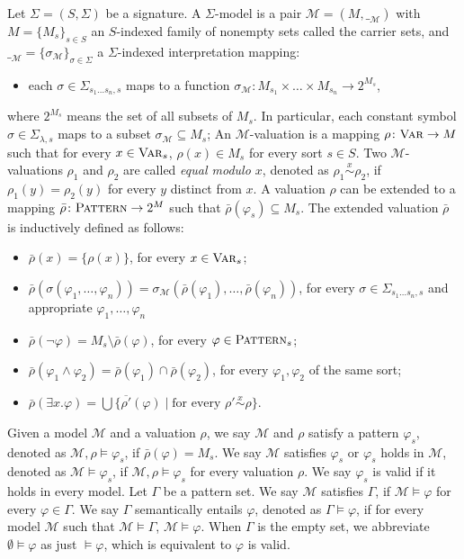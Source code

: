 \documentclass[acmsmall]{acmart}
\theoremstyle{acmdefinition}
\newcommand{\Var}{\textnormal{\textsc{Var}}}
\newcommand{\sig}{\mathbb{\Sigma}}
\newcommand{\Pattern}{\textnormal{\textsc{Pattern}}}
\newcommand{\MM}{\mathcal{M}}
\newcommand{\interp}[1]{\__{#1}}
\newcommand{\interpM}{\interp{\MM}}
\newcommand{\sigmaM}{{\sigma_{\MM}}}
\newcommand{\widebar}[1]{\overline{#1}}
\newcommand{\rhop}{\rho'}
\newcommand{\barrho}{\bar{\rho}}
\newcommand{\barrhop}{\widebar{\rhop}}
\newcommand{\simon}[1]{\overset{#1}{\sim}}
\newcommand{\simx}{\simon{x}}
\newcommand{\ddd}{,\dots,}
\newcommand{\SigmaSub}[1]{\Sigma_{#1}}
\newcommand{\pset}[1]{2^{#1}}
\begin{document}
\begin{definition}
\label{def_models}
Let $\sig = (S, \Sigma)$ be a signature.
A $\sig$-model is a pair
$\MM = (M, \interpM)$ with
$M = \{M_s\}_{s \in S}$ an $S$-indexed family of nonempty sets called
the carrier sets,
and $\interpM = \{ \sigmaM \}_{\sigma \in \Sigma}$
a $\Sigma$-indexed interpretation mapping:
\begin{itemize}
\item each $\sigma \in \SigmaSub{s_1 \dots s_n , s}$
      maps to a function
      $\sigmaM \colon M_{s_1} \times \dots \times M_{s_n} \to \pset{M_s}$,
\end{itemize}
where $2^{M_s}$ means the set of all subsets of $M_s$.
In particular, each constant symbol
$\sigma \in \SigmaSub{\lambda,s}$ 
maps to a subset $\sigmaM \subseteq M_s$;
An $\MM$-valuation is a mapping
$\rho \colon \Var \to M$
such that for every $x \in \Var_s$, $\rho(x) \in M_s$ for every sort $s \in S$.
Two $\MM$-valuations $\rho_1$ and $\rho_2$ are called 
\emph{equal modulo $x$},
denoted as $\rho_1 \simx \rho_2$,
if $\rho_1(y) = \rho_2(y)$ for every $y$ distinct from $x$.
A valuation $\rho$ can be extended to a mapping
$\barrho \colon \Pattern \to \pset{M}$
such that $\barrho(\varphi_s) \subseteq M_s$.
The extended valuation $\barrho$ is inductively defined as follows:
\begin{itemize}
\item $\barrho(x) = \{ \rho(x) \}$, for every $x \in \Var_s$;
\item $\barrho(\sigma(\varphi_1 \ddd \varphi_n))
       = \sigmaM( \barrho(\varphi_1) \ddd \barrho(\varphi_n) )$,
      for every $\sigma \in \SigmaSub{s_1 \dots s_n , s}$
      and appropriate $\varphi_1 \ddd \varphi_n$
\item $\barrho(\neg \varphi) = M_s \setminus \barrho(\varphi)$,
      for every $\varphi \in \Pattern_s$;
\item $\barrho(\varphi_1 \wedge \varphi_2)
       = \barrho(\varphi_1) \cap \barrho(\varphi_2)$,
      for every $\varphi_1,\varphi_2$ of the same sort;
\item $\barrho(\exists x . \varphi)
       = \bigcup \{ \barrhop(\varphi) 
                    \mid \text{for every $\rhop \simx \rho$} \}$.
\end{itemize}
Given a model $\MM$ and a valuation $\rho$,
we say $\MM$ and $\rho$ satisfy a pattern $\varphi_s$,
denoted as $\MM,\rho \vDash \varphi_s$,
if $\barrho(\varphi) = M_s$.
We say $\MM$ satisfies $\varphi_s$
or $\varphi_s$ holds in $\MM$,
denoted as $\MM \vDash \varphi_s$,
if $\MM , \rho \vDash \varphi_s$ for every valuation $\rho$.
We say $\varphi_s$ is valid if
it holds in every model.
Let $\Gamma$ be a pattern set.
We say $\MM$ satisfies $\Gamma$, if
$\MM \vDash \varphi$ for every $\varphi \in \Gamma$.
We say $\Gamma$ semantically entails $\varphi$,
denoted as $\Gamma \vDash \varphi$,
if for every model $\MM$ such that $\MM \vDash \Gamma$,
$\MM \vDash \varphi$.
When $\Gamma$ is the empty set, we abbreviate
$\emptyset \vDash \varphi$ as just $\vDash \varphi$,
which is equivalent to $\varphi$ is valid.
\end{definition}
\end{document}
